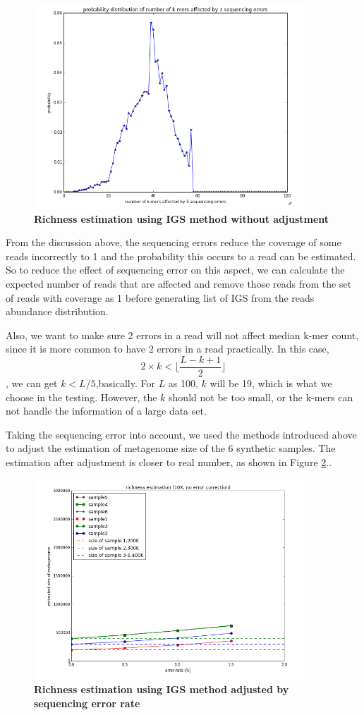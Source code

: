 \begin{figure}[!ht]
 \centerline{\includegraphics[width=4in]{./figures/IGS_affected_k_kmers.png}}
\caption{\bf Richness estimation using IGS method without adjustment }
\label{fig:IGS_affected_k_kmers}
\end{figure}

From the discussion above, the sequencing errors reduce the coverage of some
reads incorrectly to 1 and the probability this occurs to a read can be
estimated. So to reduce the effect of sequencing error on this aspect, we can
calculate the expected number of reads that are affected and remove those reads
from the set of reads with coverage as 1 before generating list of IGS from the
reads abundance distribution.

Also, we want to make sure 2 errors in a read will not affect median k-mer 
count, since it is more common to have 2 errors in a read practically. 
In this case, 
\[2 \times k < \lfloor \frac{L-k+1}{2}\rfloor \],
we can get $k<L/5$,basically. For $L$ as 100, $k$ will be 19, which is what we 
choose in the testing. However, the $k$ should not be too small, or the k-mers 
can not handle the information of a large data set.

Taking the sequencing error into account, we used the methods introduced above
to adjust the estimation of metagenome size of the 6 synthetic samples. The
estimation after adjustment is closer to real number, as shown in Figure
\ref{fig:IGS_richness_error_adjustment}..


\begin{figure}[!ht]
 \centerline{\includegraphics[width=4in]{./figures/IGS_richness_error_adjustment.png}}
\caption{\bf Richness estimation using IGS method adjusted by sequencing error rate}
\label{fig:IGS_richness_error_adjustment}
\end{figure}

